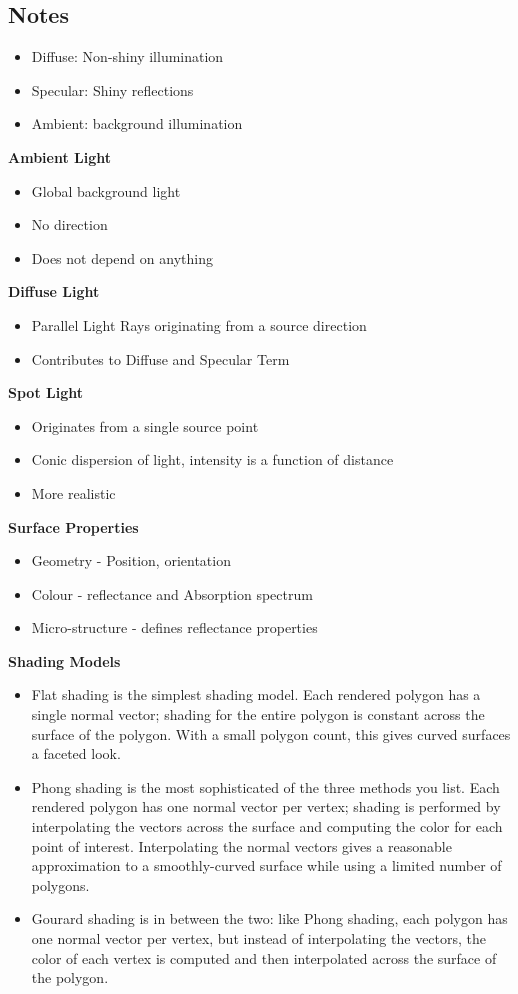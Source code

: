 \subsection{Notes}
\begin{itemize}
	\item Diffuse: Non-shiny illumination
	\item Specular: Shiny reflections
	\item Ambient: background illumination
\end{itemize}
\textbf{Ambient Light}
\begin{itemize}
	\item Global background light
	\item No direction
	\item Does not depend on anything
\end{itemize}
\textbf{Diffuse Light}
\begin{itemize}
	\item Parallel Light Rays originating from a source direction
	\item Contributes to Diffuse and Specular Term
\end{itemize}
\textbf{Spot Light}
\begin{itemize}
	\item Originates from a single source point
	\item Conic dispersion of light, intensity is a function of distance
	\item More realistic
\end{itemize}
\textbf{Surface Properties}
\begin{itemize}
	\item Geometry - Position, orientation
	\item Colour - reflectance and Absorption spectrum
	\item Micro-structure - defines reflectance properties
\end{itemize}
\textbf{Shading Models}
\begin{itemize}
	\item	Flat shading is the simplest shading model. Each rendered polygon has a single normal vector; shading for the entire polygon is constant across the surface of the polygon. With a small polygon count, this gives curved surfaces a faceted look.
	
	\item	Phong shading is the most sophisticated of the three methods you list. Each rendered polygon has one normal vector per vertex; shading is performed by interpolating the vectors across the surface and computing the color for each point of interest. Interpolating the normal vectors gives a reasonable approximation to a smoothly-curved surface while using a limited number of polygons.
	
	\item	Gourard shading is in between the two: like Phong shading, each polygon has one normal vector per vertex, but instead of interpolating the vectors, the color of each vertex is computed and then interpolated across the surface of the polygon.
\end{itemize}
